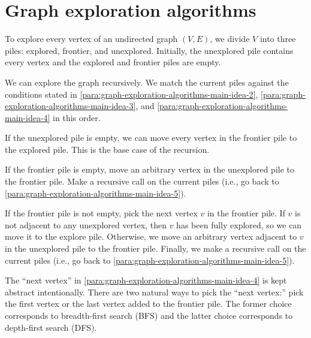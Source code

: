 \documentclass{amsart}
\begin{document}
\section{Graph exploration algorithms}
\label{sec:graph-exploration-algorithms}

\para
\label{para:graph-exploration-algorithms-main-idea-1}
To explore every vertex of an undirected graph $(V,E)$, we divide $V$ into three piles: explored, frontier, and unexplored.
Initially, the unexplored pile contains every vertex and the explored and frontier piles are empty.

\para
\label{para:graph-exploration-algorithms-main-idea-5}
We can explore the graph recursively.
We match the current piles against the conditions stated in
\ref{para:graph-exploration-algorithms-main-idea-2},
\ref{para:graph-exploration-algorithms-main-idea-3}, and
\ref{para:graph-exploration-algorithms-main-idea-4}
in this order.

\para
\label{para:graph-exploration-algorithms-main-idea-2}
If the unexplored pile is empty, we can move every vertex in the frontier pile to the explored pile.
This is the base case of the recursion.

\para
\label{para:graph-exploration-algorithms-main-idea-3}
If the frontier pile is empty, move an arbitrary vertex in the unexplored pile to the frontier pile.
Make a recursive call on the current piles (i.e., go back to \ref{para:graph-exploration-algorithms-main-idea-5}).

\para
\label{para:graph-exploration-algorithms-main-idea-4}
If the frontier pile is not empty, pick the next vertex $v$ in the frontier pile.
If $v$ is not adjacent to any unexplored vertex, then $v$ has been fully explored, so we can move it to the explore pile.
Otherwise, we move an arbitrary vertex adjacent to $v$ in the unexplored pile to the frontier pile.
Finally, we make a recursive call on the current piles (i.e., go back to \ref{para:graph-exploration-algorithms-main-idea-5}).

\begin{rmk}
  \label{rmk:graph-exploration-algorithms-next-vertex}
  The ``next vertex'' in \ref{para:graph-exploration-algorithms-main-idea-4} is kept abstract intentionally.
  There are two natural ways to pick the ``next vertex:'' pick the first vertex or the last vertex added to the frontier pile.
  The former choice corresponds to breadth-first search (BFS) and the latter choice corresponds to depth-first search (DFS).
\end{rmk}
\end{document}
